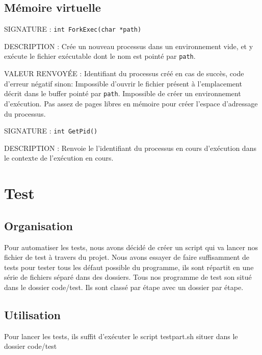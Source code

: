 \documentclass{article}
\begin{document}
	\subsection{Mémoire virtuelle}
		\begin{description}
			\item{SIGNATURE : } \texttt{int ForkExec(char *path)}
			\item{DESCRIPTION : } Crée un nouveau processus dans un environnement vide, et y exécute le fichier exécutable dont le nom est pointé par \texttt{path}.
			\item{VALEUR RENVOYÉE : } Identifiant du processus créé en cas de succès, code d'erreur négatif sinon:
				 Impossible d'ouvrir le fichier présent à l'emplacement décrit dans le buffer pointé par \texttt{path}.
				 Impossible de créer un environnement d'exécution.
				 Pas assez de pages libres en mémoire pour créer l'espace d'adressage du processus.
		\end{description}
		\vspace{2.5mm}
		\begin{description}
			\item{SIGNATURE : } \texttt{int GetPid()}
			\item{DESCRIPTION : Renvoie le l'identifiant du processus en cours d'exécution dans le contexte de l'exécution en cours. } 
		\end{description}

\section{Test}
	\subsection{Organisation}
		{Pour automatiser les tests, nous avons décidé de créer un script qui va lancer nos fichier de test à travers du projet.
		Nous avons essayer de faire suffisamment de tests pour tester tous les défaut possible du programme, ils sont répartit en une série de fichiers séparé dans des dossiers.
		Tous nos programme de test son situé dans le dossier code/test. Ils sont classé par étape avec un dossier par étape.}

	\subsection{Utilisation}
		{Pour lancer les tests, ils suffit d'exécuter le script testpart.sh situer dans le dossier code/test}
\end{document}
